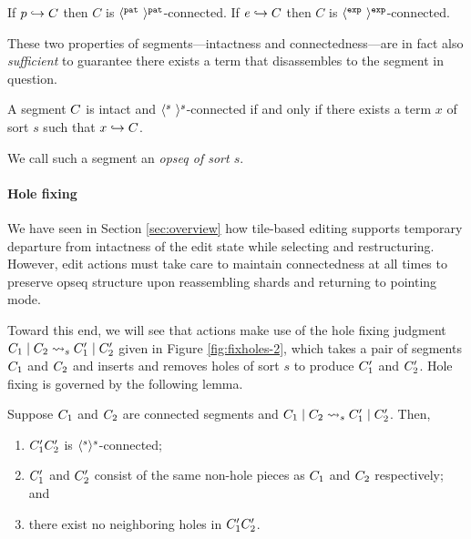 \begin{lemma}
  If $p\hookrightarrow C$ then $C$ is $\langle^{\texttt{pat}}~\rangle^{\texttt{pat}}$-connected.
  If $e\hookrightarrow C$ then $C$ is $\langle^{\texttt{exp}}~\rangle^{\texttt{exp}}$-connected.
\end{lemma}




These two properties of segments---intactness
and connectedness---are in fact also \emph{sufficient} to
guarantee there exists a term that disassembles to
the segment in question.

\begin{theorem} \label{thm:term-parseability}
  A segment $C$ is intact and $\langle^{s}~\rangle^{s}$-connected
  if and only if there exists a term $x$ of sort $s$ such that
  $x\hookrightarrow C$.
\end{theorem}
\noindent
We call such a segment an \emph{opseq of sort $s$}.

\paragraph{Hole fixing}
We have seen in Section \ref{sec:overview} how tile-based
editing supports temporary departure from intactness of
the edit state while selecting and restructuring.
However, edit actions must take care to maintain
connectedness at all times to preserve opseq structure
upon reassembling shards and returning to pointing mode.



Toward this end, we will see that actions make use of the hole fixing judgment
$C_1\mid C_2\rightsquigarrow_{s}C'_1\mid C'_2$
given in Figure \ref{fig:fixholes-2},
which takes a pair of segments $C_1$ and $C_2$
and inserts and removes holes of sort $s$ to produce $C'_1$
and $C'_2$.
Hole fixing is governed by the following lemma.


\begin{lemma}
  Suppose $C_1$ and $C_2$ are connected segments
  and $C_1\mid C_2\rightsquigarrow_{s}C'_1\mid C'_2$.
  Then,
  \begin{enumerate}
    \item $C'_1C'_2$ is $\langle^{s}\rangle^{s}$-connected;
    \item $C'_1$ and $C'_2$ consist of the same non-hole pieces as
        $C_1$ and $C_2$ respectively; and
    \item there exist no neighboring holes in $C'_1C'_2$.
  \end{enumerate}
\end{lemma}

